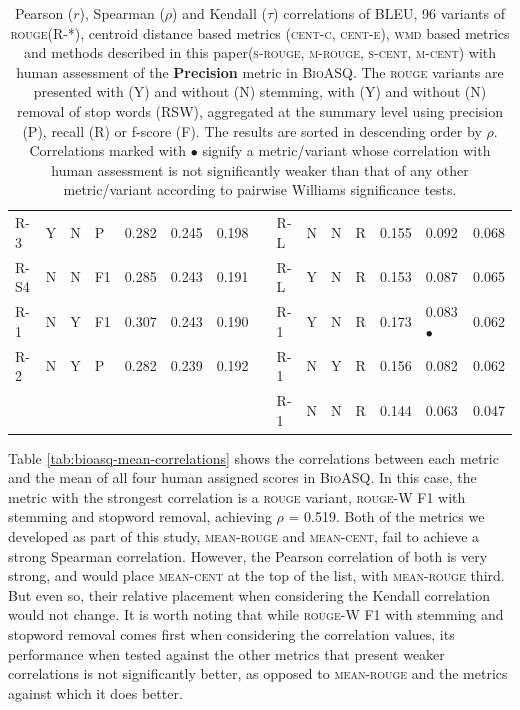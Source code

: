 \documentclass[11pt,a4paper]{article}
\newcommand{\rouge}{\textsc{rouge}\xspace}
\newcommand{\centc}{\textsc{cent-c}\xspace}
\newcommand{\cente}{\textsc{cent-e}\xspace}
\newcommand{\wmd}{\textsc{wmd}\xspace}
\newcommand{\bioasq}{\textsc{BioASQ}\xspace}
\newcommand{\srouge}{\textsc{s-rouge}\xspace}
\newcommand{\mrouge}{\textsc{m-rouge}\xspace}
\newcommand{\scent}{\textsc{s-cent}\xspace}
\newcommand{\mcent}{\textsc{m-cent}\xspace}
\newcommand{\meanrouge}{\textsc{mean-rouge}\xspace}
\newcommand{\meancent}{\textsc{mean-cent}\xspace}
\begin{document}
\begin{table}[]
{\begin{tabular}{lllllllllllllll}
\textsc{R-3} & Y & N & P & 0.282 & 0.245 & 0.198 &  & \textsc{R-L} & N & N & R & 0.155 & 0.092 & 0.068 \\
\textsc{R-S4} & N & N & F1 & 0.285 & 0.243 & 0.191 &  & \textsc{R-L} & Y & N & R & 0.153 & 0.087 & 0.065 \\
\textsc{R-1} & N & Y & F1 & 0.307 & 0.243 & 0.190 &  & \textsc{R-1} & Y & N & R & 0.173 & 0.083 $\bullet$ & 0.062 \\
\textsc{R-2} & N & Y & P & 0.282 & 0.239 & 0.192 &  & \textsc{R-1} & N & Y & R & 0.156 & 0.082 & 0.062 \\
 &  &  &  &  &  &  &  & \textsc{R-1} & N & N & R & 0.144 & 0.063 & 0.047 \\ \hline
\end{tabular}
}
\caption{Pearson ($r$), Spearman ($\rho$) and Kendall ($\tau$) correlations of BLEU, 96 variants 
of \rouge (R-*), centroid distance based metrics (\centc, \cente), \wmd based metrics and 
methods described in this paper(\srouge, \mrouge, \scent, \mcent) with human assessment of the \textbf{Precision} metric in \bioasq. The \rouge 
variants are presented with (Y) and without (N) stemming, with (Y) and without (N) removal of 
stop words (RSW), aggregated at the summary level using precision (P), recall (R) or f-score (F).
The results are sorted in descending order by $\rho$. Correlations marked with $\bullet$ signify 
a metric/variant whose correlation with human assessment is not significantly weaker than that 
of any other metric/variant according to pairwise Williams significance tests.}
\label{tab:bioasq-precision-correlations}
\end{table}

Table \ref{tab:bioasq-mean-correlations} shows the correlations between each metric and the mean of all 
four human assigned scores in \bioasq. In this case, the metric with the strongest correlation is 
a \rouge variant, \rouge-W F1 with stemming and stopword removal, achieving $\rho$ = 0.519. Both of 
the metrics we developed as part of this study, \meanrouge and \meancent, fail to achieve a strong 
Spearman correlation. However, the Pearson correlation of both is very strong, and would place \meancent 
at the top of the list, with \meanrouge third. But even so, their relative placement when considering 
the Kendall correlation would not change. It is worth noting that while \rouge-W F1 with stemming 
and stopword removal comes first when considering the correlation values, its performance when 
tested against the other metrics that present weaker correlations is not significantly better, 
as opposed to \meanrouge and the metrics against which it does better.
\end{document}
